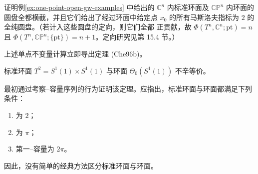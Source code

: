 \begin{exercise}
\label{ex:classify-minimal-maslov-discs-tori}
证明例\ref{ex:one-point-open-gw-examples} 中给出的 $\mathbb C^n$ 内标准环面及
$\mathbb{CP}^n$ 内\personClifford{}环面的圆盘全都横截，并且它们给出了经过环面中给定点
$x_0$ 的所有马斯洛夫指标为 $2$ 的全纯圆盘。（若计入这些圆盘的定向，则它们全都
正贡献，故
$\Phi(T^n,\mathbb C^n;\mathrm{pt})=n$ 且
$\Phi(T^n,\mathbb{CP}^n;\{\mathrm{pt}\})=n+1$。定向研究见第 15.4 节。）
\end{exercise}

上述单点不变量计算立即导出\personChekanov{}定理 (Che96b)。

\begin{theorem}[\personChekanov{}]
\label{thm:standard-chekanov-tori-not-symplectically-equivalent}
标准环面 $T^2=S^1(1)\times S^1(1)$ 与\personChekanov{}环面
$\Theta_0(S^1(1))$ 不辛等价。
\end{theorem}

\personChekanov{}最初通过考察\personEkeland{}--\personHofer{}容量序列的行为证明该定理。应指出，标准环面与\personChekanov{}环面都满足下列条件：
\begin{enumerate}[label=(\arabic*)]
\item \termMinimalMaslovNumber{}为 $2$；
\item \termMonotonicityConstant{}为 $\pi$；
\item 第一\personEkeland{}--\personHofer{}容量为 $2\pi$。
\end{enumerate}
因此，没有简单的经典方法区分标准环面与\personChekanov{}环面。
